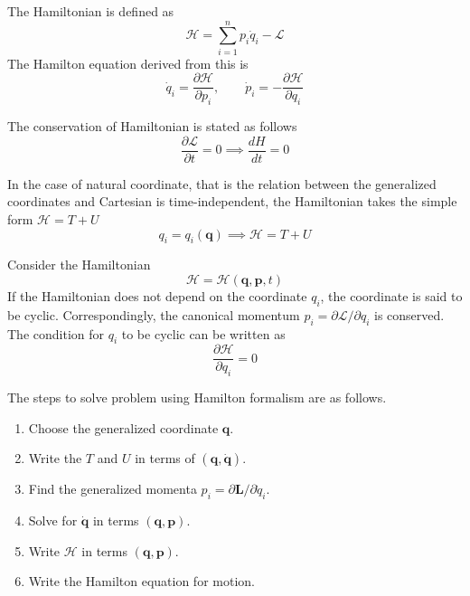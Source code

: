 \documentclass[../../../main.tex]{subfiles}
\begin{document}
The Hamiltonian is defined as
\begin{equation*}
	\mathcal{H}=\sum_{i=1}^{n}p_i\dot{q}_i-\mathcal{L}
\end{equation*}
The Hamilton equation derived from this is
\begin{equation*}
	\dot{q}_i=\frac{\partial\mathcal{H}}{\partial p_i},\qquad\dot{p}_i=-\frac{\partial\mathcal{H}}{\partial q_i}
\end{equation*}

The conservation of Hamiltonian is stated as follows
\begin{equation*}
	\frac{\partial\mathcal{L}}{\partial t}=0\implies\frac{dH}{dt}=0
\end{equation*}

In the case of natural coordinate, that is the relation between the generalized coordinates and Cartesian is time-independent, the Hamiltonian takes the simple form $\mathcal{H}=T+U$
\begin{equation*}
	q_i=q_i(\mathbf{q})\implies\mathcal{H}=T+U
\end{equation*}

Consider the Hamiltonian 
\begin{equation*}
	\mathcal{H }=\mathcal{H }\left( \mathbf{q}, \mathbf{p},t \right) 
\end{equation*}
If the Hamiltonian does not depend on the coordinate $q_i$, the coordinate is said to be cyclic.
Correspondingly, the canonical momentum $p_i= \partial \mathcal{L }/\partial q_i$ is conserved.
The condition for $q_i$ to be cyclic can be written as 
\begin{equation*}
	\frac{\partial \mathcal{H }}{\partial q_i }=0
\end{equation*}

The steps to solve problem using Hamilton formalism are as follows.
\begin{enumerate}
    \item Choose the generalized coordinate $\mathbf{q}$.
    \item Write the $T$ and $U$ in terms of $(\mathbf{q},\dot{\mathbf{q}})$.
    \item Find the generalized momenta $p_i=\partial\mathbf{L}/\partial \dot{q}_i$.
    \item Solve for $\dot{\mathbf{q}}$ in terms $(\mathbf{q},\mathbf{p})$.
    \item Write $\mathcal{H}$ in terms $(\mathbf{q},\mathbf{p})$.
    \item Write the Hamilton equation for motion.
\end{enumerate}
\end{document}
